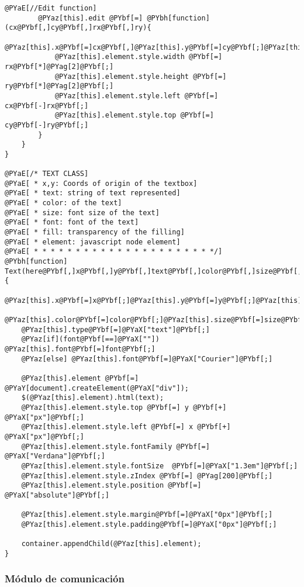 \begin{Verbatim}[commandchars=@\[\]]
		@PYaE[//Edit function]
		@PYaz[this].edit @PYbf[=] @PYbh[function](cx@PYbf[,]cy@PYbf[,]rx@PYbf[,]ry){
			@PYaz[this].x@PYbf[=]cx@PYbf[,]@PYaz[this].y@PYbf[=]cy@PYbf[;]@PYaz[this].rx@PYbf[=]rx@PYbf[;]@PYaz[this].ry@PYbf[=]ry@PYbf[;]
			@PYaz[this].element.style.width @PYbf[=] rx@PYbf[*]@PYag[2]@PYbf[;]
	        @PYaz[this].element.style.height @PYbf[=] ry@PYbf[*]@PYag[2]@PYbf[;]
	        @PYaz[this].element.style.left @PYbf[=] cx@PYbf[-]rx@PYbf[;]
	        @PYaz[this].element.style.top @PYbf[=] cy@PYbf[-]ry@PYbf[;]
		}
	}
}

@PYaE[/* TEXT CLASS]
@PYaE[ * x,y: Coords of origin of the textbox]
@PYaE[ * text: string of text represented]
@PYaE[ * color: of the text]
@PYaE[ * size: font size of the text]
@PYaE[ * font: font of the text]
@PYaE[ * fill: transparency of the filling]
@PYaE[ * element: javascript node element]
@PYaE[ * * * * * * * * * * * * * * * * * * * * * */]
@PYbh[function] Text(here@PYbf[,]x@PYbf[,]y@PYbf[,]text@PYbf[,]color@PYbf[,]size@PYbf[,]font@PYbf[,]fill){
	@PYaz[this].x@PYbf[=]x@PYbf[;]@PYaz[this].y@PYbf[=]y@PYbf[;]@PYaz[this].text@PYbf[=]text@PYbf[;]
	@PYaz[this].color@PYbf[=]color@PYbf[;]@PYaz[this].size@PYbf[=]size@PYbf[;]@PYaz[this].fill@PYbf[=]fill@PYbf[;]
	@PYaz[this].type@PYbf[=]@PYaX["text"]@PYbf[;]
	@PYaz[if](font@PYbf[==]@PYaX[""]) @PYaz[this].font@PYbf[=]font@PYbf[;]
	@PYaz[else] @PYaz[this].font@PYbf[=]@PYaX["Courier"]@PYbf[;]
	
	@PYaz[this].element @PYbf[=] @PYaY[document].createElement(@PYaX["div"]);
	$(@PYaz[this].element).html(text);
	@PYaz[this].element.style.top @PYbf[=] y @PYbf[+] @PYaX["px"]@PYbf[;]
	@PYaz[this].element.style.left @PYbf[=] x @PYbf[+] @PYaX["px"]@PYbf[;]
	@PYaz[this].element.style.fontFamily @PYbf[=] @PYaX["Verdana"]@PYbf[;]
	@PYaz[this].element.style.fontSize  @PYbf[=]@PYaX["1.3em"]@PYbf[;]
	@PYaz[this].element.style.zIndex @PYbf[=] @PYag[200]@PYbf[;]
	@PYaz[this].element.style.position @PYbf[=] @PYaX["absolute"]@PYbf[;]
	
	@PYaz[this].element.style.margin@PYbf[=]@PYaX["0px"]@PYbf[;]
	@PYaz[this].element.style.padding@PYbf[=]@PYaX["0px"]@PYbf[;]
	
	container.appendChild(@PYaz[this].element);
}
\end{Verbatim}


\subsubsection{Módulo de comunicación} %
\label{ssub:módulo_de_comunicación}

